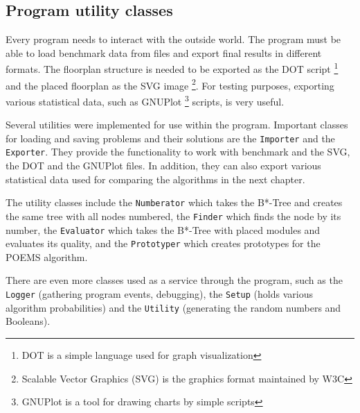 \subsection{Program utility classes}

Every program needs to interact with the outside world. The program must be able to load benchmark data from files and export final results in different formats. The floorplan structure is needed to be exported as the DOT script \footnote{DOT is a simple language used for graph visualization} and the placed floorplan as the SVG image \footnote{Scalable Vector Graphics (SVG) is the graphics format maintained by W3C}. For testing purposes, exporting various statistical data, such as GNUPlot \footnote{GNUPlot is a tool for drawing charts by simple scripts} scripts, is very useful.

Several utilities were implemented for use within the program. Important classes for loading and saving problems and their solutions are the {\tt Importer} and the {\tt Exporter}. They provide the functionality to work with benchmark and the SVG, the DOT and the GNUPlot files. In addition, they can also export various statistical data used for comparing the algorithms in the next chapter.

The utility classes include the {\tt Numberator} which takes the B*-Tree and creates the same tree with all nodes numbered, the {\tt Finder} which finds the node by its number, the {\tt Evaluator} which takes the B*-Tree with placed modules and evaluates its quality, and the {\tt Prototyper} which creates prototypes for the POEMS algorithm.

There are even more classes used as a service through the program, such as the {\tt Logger} (gathering program events, debugging), the {\tt Setup} (holds various algorithm probabilities) and the {\tt Utility} (generating the random numbers and Booleans).
